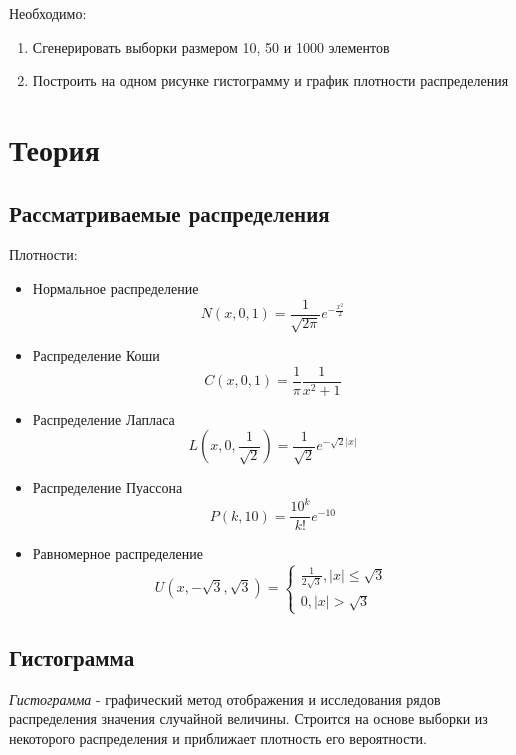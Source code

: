 \documentclass[12pt,a4paper]{article}
\begin{document}
Необходимо:
\begin{enumerate}
    \item Сгенерировать выборки размером 10, 50 и 1000 элементов
    \item Построить на одном рисунке гистограмму и график плотности распределения
\end{enumerate}

\section{Теория}
\subsection{Рассматриваемые распределения}
Плотности:
\begin{itemize}
		\item Нормальное распределение
		    \begin{equation}
			    N(x,0,1)=\frac{1}{\sqrt{2\pi}}e^{-\frac{x^2}{2}}
			    \label{normal} 
			\end{equation}
		\item Распределение Коши
		    \begin{equation}
				C(x,0,1)=\frac{1}{\pi}\frac{1}{x^2+1}
				\label{cauchy}
			\end{equation} 
		\item Распределение Лапласа
		    \begin{equation}
				L(x,0,\frac{1}{\sqrt{2}})=\frac{1}{\sqrt{2}}e^{-\sqrt{2}|x|}
				\label{laplace} 
			\end{equation}
		\item Распределение Пуассона
		    \begin{equation}
				P(k,10)=\frac{10^k}{k!}e^{-10}
				\label{poisson}
			\end{equation}
		\item Равномерное распределение
		    \begin{equation}
				U(x,-\sqrt{3},\sqrt{3})=
				\begin{cases}
					\frac{1}{2\sqrt{3}},|x|\leq\sqrt{3}\\0,|x|>\sqrt{3}
				\end{cases}
				\label{uniform}
			\end{equation}
\end{itemize}

\subsection{Гистограмма}
\textit{Гистограмма} - графический метод отображения и исследования рядов распределения значения случайной величины. Строится на основе выборки из некоторого распределения и приближает плотность его вероятности.
\end{document}
